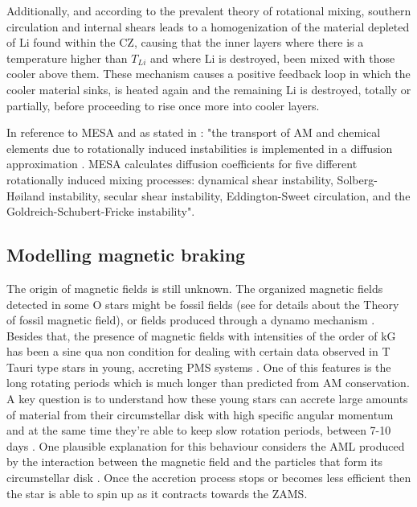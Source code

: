 \documentclass[fleqn,usenatbib]{mnras}
\begin{document}
Additionally, and according to the prevalent theory of rotational mixing, southern circulation and internal shears leads to a homogenization of the material depleted of Li found within the CZ, causing that the inner layers where there is a temperature higher than $T_{Li}$ and where Li is destroyed, been mixed with those cooler above them. These mechanism causes a positive feedback loop in which the cooler material sinks, is heated again and the remaining Li is destroyed, totally or partially, before proceeding to rise once more into cooler layers. \par

In reference to MESA and as stated in \citet{Paxton2013}: "the transport of AM and chemical elements due to rotationally induced instabilities is implemented in a diffusion approximation \citet{Endal1978}. MESA calculates diffusion coefficients for five different rotationally induced mixing processes: dynamical shear instability, Solberg-H{\o}iland instability, secular shear instability, Eddington-Sweet circulation, and the Goldreich-Schubert-Fricke instability". 

\subsection{Modelling magnetic braking}
The origin of magnetic fields is still unknown. The organized magnetic fields detected in some O stars \citep{Wade2010} might be fossil fields (see \citet{Dudorov2014} for details about the Theory of fossil magnetic field), or fields produced through a dynamo mechanism \citep{Cantiello2009}. Besides that, the presence of magnetic fields with intensities of the order of kG \citep{Hussain2014} has been a sine qua non condition for dealing with certain data observed in T Tauri type stars in young, accreting PMS systems \citep{Johns-Krull2007}. One of this features is the long rotating periods  which is much longer than predicted from AM conservation. A key question is to understand how these young stars can accrete large amounts of material from their circumstellar disk with high specific angular momentum and at the same time they're able to keep slow rotation periods, between 7-10 days \citep{Hussain2014}. One plausible explanation for this behaviour considers the AML produced by the interaction between the magnetic field and the particles that form its circumstellar disk \citep{Zanni2012}. Once the accretion process stops or becomes less efficient then the star is able to spin up as it contracts towards the ZAMS.\par
\end{document}
